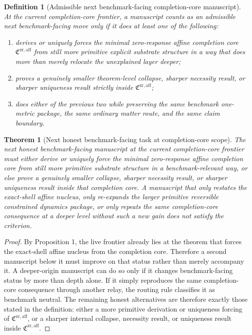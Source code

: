 \documentclass[11pt]{article}
\newcommand{\CompletionCore}{\mathfrak C^{\mathrm{zr,aff}}}
\newtheorem{definition}{Definition}
\newtheorem{theorem}{Theorem}
\begin{document}
\begin{definition}[Admissible next benchmark-facing completion-core manuscript]
At the current completion-core frontier, a manuscript counts as an admissible next benchmark-facing move only if it does at least one of the following:
\begin{enumerate}
    \item derives or uniquely forces the minimal zero-response affine completion core \(\CompletionCore\) from still more primitive explicit substrate structure in a way that does more than merely relocate the unexplained layer deeper;
    \item proves a genuinely smaller theorem-level collapse, sharper necessity result, or sharper uniqueness result strictly inside \(\CompletionCore\);
    \item does either of the previous two while preserving the same benchmark one-metric package, the same ordinary matter route, and the same claim boundary.
\end{enumerate}
\end{definition}

\begin{theorem}[Next honest benchmark-facing task at completion-core scope]
The next honest benchmark-facing manuscript at the current completion-core frontier must either derive or uniquely force the minimal zero-response affine completion core from still more primitive substrate structure in a benchmark-relevant way, or else prove a genuinely smaller collapse, sharper necessity result, or sharper uniqueness result inside that completion core. A manuscript that only restates the exact-shell affine nucleus, only re-expands the larger primitive reversible constrained dynamics package, or only repeats the same completion-core consequence at a deeper level without such a new gain does not satisfy the criterion.
\end{theorem}

\begin{proof}
By Proposition 1, the live frontier already lies at the theorem that forces the exact-shell affine nucleus from the completion core. Therefore a second manuscript below it must improve on that status rather than merely accompany it. A deeper-origin manuscript can do so only if it changes benchmark-facing status by more than depth alone. If it simply reproduces the same completion-core consequence through another relay, the routing rule classifies it as benchmark neutral. The remaining honest alternatives are therefore exactly those stated in the definition: either a more primitive derivation or uniqueness forcing of \(\CompletionCore\), or a sharper internal collapse, necessity result, or uniqueness result inside \(\CompletionCore\).
\end{proof}
\end{document}
